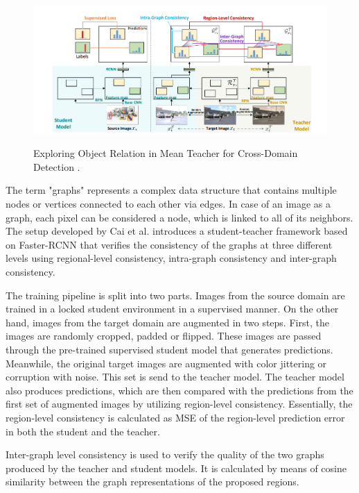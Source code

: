 \begin{figure}[htb]
	\begin{center}
		\includegraphics[width=16cm]{./graph_teacher.png}
	\end{center}
	\caption{Exploring Object Relation in Mean Teacher for Cross-Domain Detection \cite{Cai2019}.}
	\begin{center}
		\label{graph_MT}
	\end{center}
\end{figure}
\FloatBarrier

The term "graphs" represents a complex data structure that contains multiple nodes or vertices connected to each other via edges. In case of an image as a graph, each pixel can be considered a node, which is linked to all of its neighbors. 
The setup developed by Cai et al. \cite{Cai2019} introduces a student-teacher framework based on Faster-RCNN that verifies the consistency of the graphs at three different levels using regional-level consistency, intra-graph consistency and inter-graph consistency. 

The training pipeline is split into two parts. Images from the source domain are trained in a locked student environment in a supervised manner.  On the other hand, images from the target domain are augmented in two steps. First, the images are randomly cropped, padded or flipped. These images are passed through the pre-trained supervised student model that generates predictions. Meanwhile, the original target images are augmented with color jittering or corruption with noise. This set is send to the teacher model. The teacher model also produces predictions, which are then compared with the predictions from the first set of augmented images by utilizing region-level consistency. Essentially, the region-level consistency is calculated as MSE of the region-level prediction error in  both the student and the teacher. 

Inter-graph level consistency is used to verify the quality of the two graphs produced by the teacher and student models. It is calculated by means of cosine similarity between the graph representations of the proposed regions. 

